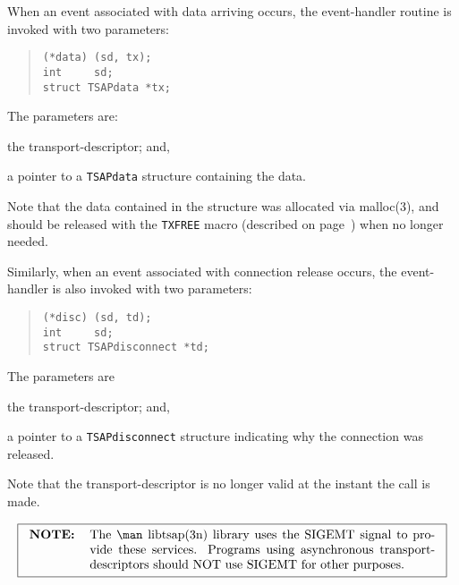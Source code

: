 When an event associated with data arriving occurs,
the event-handler routine is invoked with two parameters:
\begin{quote}\small\begin{verbatim}
(*data) (sd, tx);
int     sd;
struct TSAPdata *tx;
\end{verbatim}\end{quote}
The parameters are:
\begin{describe}
\item[\verb"sd":] the transport-descriptor;
and,

\item[\verb"tx":] a pointer to a \verb"TSAPdata" structure containing
the data.
\end{describe}
Note that the data contained in the structure was allocated via \man malloc(3),
and should be released with the \verb"TXFREE" macro
(described on page~\pageref{TXFREE}) when no longer needed.

Similarly,
when an event associated with connection release occurs,
the event-handler is also invoked with two parameters:
\begin{quote}\small\begin{verbatim}
(*disc) (sd, td);
int     sd;
struct TSAPdisconnect *td;
\end{verbatim}\end{quote}
The parameters are
\begin{describe}
\item[\verb"sd":] the transport-descriptor;
and,

\item[\verb"td":] a pointer to a \verb"TSAPdisconnect" structure
indicating why the connection was released.
\end{describe}
Note that the transport-descriptor is no longer valid at the instant the
call is made.

\[\fbox{\begin{tabular}{lp{0.8\textwidth}}
\bf NOTE:&	The \man libtsap(3n) library uses the SIGEMT signal to provide
		these services.
		Programs using asynchronous transport-descriptors should NOT
		use SIGEMT for other purposes.
\end{tabular}}\]


